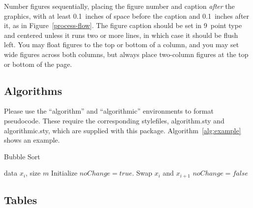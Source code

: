 \documentclass{article}
\begin{document}
Number figures sequentially, placing the figure number and caption 
{\it after\/} the graphics, with at least 0.1~inches of space before the
caption and 0.1~inches after it, as in Figure~\ref{process-flow}. 
The figure caption should be set in 9~point type and centered unless
it runs two or more lines, in which case it should be flush left. 
You may float figures to the top or bottom of a column, and you may
set wide figures across both columns, but always place two-column
figures at the top or bottom of the page.


\subsection{Algorithms}

Please use the ``algorithm'' and ``algorithmic'' 
environments to format pseudocode. These require 
the corresponding stylefiles, algorithm.sty and 
algorithmic.sty, which are supplied with this package. 
Algorithm~\ref{alg:example} shows an example. 

\begin{algorithm}[tb]
   \caption{Bubble Sort}
   \label{alg:example}
\begin{algorithmic}
    data $x_i$, size $m$
   \REPEAT
   \STATE Initialize $noChange = true$.
   \STATE Swap $x_i$ and $x_{i+1}$
   \STATE $noChange = false$
   \ENDIF
   \ENDFOR
\end{algorithmic}
\end{algorithm}
 
\subsection{Tables} 
 
\end{document}

